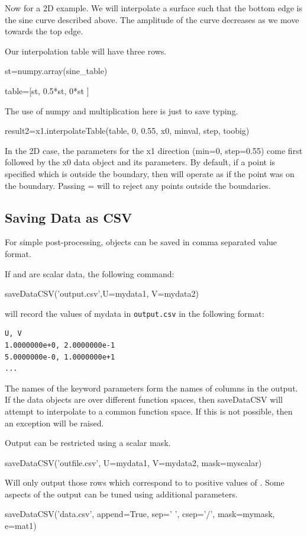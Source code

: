 Now for a 2D example.
We will interpolate a surface such that the bottom edge is the sine curve described above.
The amplitude of the curve decreases as we move towards the top edge.

Our interpolation table will have three rows.
\begin{python}
st=numpy.array(sine_table)

table=[st, 0.5*st, 0*st ]
\end{python}

The use of numpy and multiplication here is just to save typing.

\begin{python}
result2=x1.interpolateTable(table, 0, 0.55, x0, minval, step, toobig)
\end{python}

In the 2D case, the parameters for the x1 direction (min=0, step=0.55) come first followed by the x0 data object and
its parameters.
By default, if a point is specified which is outside the boundary, then  will operate
as if the point was on the boundary.
Passing = will  to reject any points outside the boundaries.

\subsection{Saving Data as CSV}
For simple post-processing, \Data objects can be saved in comma separated value format.

If  and  are scalar data, the following command:
\begin{python}
saveDataCSV('output.csv',U=mydata1, V=mydata2)
\end{python}
will record the values of mydata in \texttt{output.csv} in the following format:
\begin{verbatim}
U, V
1.0000000e+0, 2.0000000e-1
5.0000000e-0, 1.0000000e+1
...
\end{verbatim}

The names of the keyword parameters form the names of columns in the output.
If the data objects are over different function spaces, then saveDataCSV will attempt to
interpolate to a common function space.
If this is not possible, then an exception will be raised.

Output can be restricted using a scalar mask.
\begin{python}
saveDataCSV('outfile.csv', U=mydata1, V=mydata2, mask=myscalar)
\end{python}
Will only output those rows which correspond to to positive values of .
Some aspects of the output can be tuned using additional parameters.
\begin{python}
saveDataCSV('data.csv', append=True, sep=' ', csep='/', mask=mymask, e=mat1)
\end{python}

